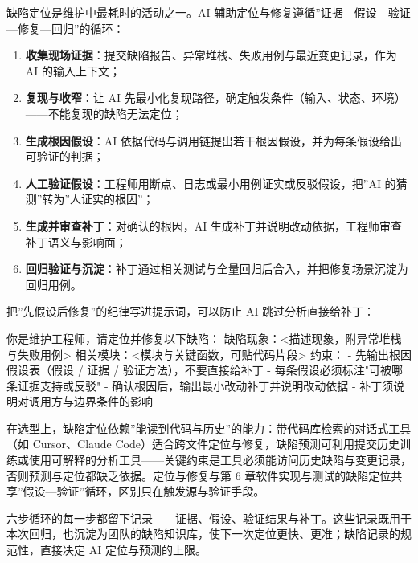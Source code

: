 \documentclass[12pt,a4paper,twoside,openany]{ctexbook}
\numberwithin{figure}{chapter}
\numberwithin{table}{chapter}
\newenvironment{Shaded}{}{}
\newcommand{\NormalTok}[1]{#1}
\providecommand{\tightlist}{\setlength{\itemsep}{0pt}\setlength{\parskip}{0pt}}
\begin{document}
缺陷定位是维护中最耗时的活动之一。AI
辅助定位与修复遵循''证据---假设---验证---修复---回归''的循环：

\begin{enumerate}
\def\labelenumi{\arabic{enumi}.}
\tightlist
\item
  \textbf{收集现场证据}：提交缺陷报告、异常堆栈、失败用例与最近变更记录，作为
  AI 的输入上下文；
\item
  \textbf{复现与收窄}：让 AI
  先最小化复现路径，确定触发条件（输入、状态、环境）------不能复现的缺陷无法定位；
\item
  \textbf{生成根因假设}：AI
  依据代码与调用链提出若干根因假设，并为每条假设给出可验证的判据；
\item
  \textbf{人工验证假设}：工程师用断点、日志或最小用例证实或反驳假设，把''AI
  的猜测''转为''人证实的根因''；
\item
  \textbf{生成并审查补丁}：对确认的根因，AI
  生成补丁并说明改动依据，工程师审查补丁语义与影响面；
\item
  \textbf{回归验证与沉淀}：补丁通过相关测试与全量回归后合入，并把修复场景沉淀为回归用例。
\end{enumerate}

把''先假设后修复''的纪律写进提示词，可以防止 AI 跳过分析直接给补丁：

\begin{Shaded}
\begin{Highlighting}[]
\NormalTok{你是维护工程师，请定位并修复以下缺陷：}
\NormalTok{缺陷现象：\textless{}描述现象，附异常堆栈与失败用例\textgreater{}}
\NormalTok{相关模块：\textless{}模块与关键函数，可贴代码片段\textgreater{}}
\NormalTok{约束：}
\NormalTok{{-} 先输出根因假设表（假设 / 证据 / 验证方法），不要直接给补丁}
\NormalTok{{-} 每条假设必须标注"可被哪条证据支持或反驳"}
\NormalTok{{-} 确认根因后，输出最小改动补丁并说明改动依据}
\NormalTok{{-} 补丁须说明对调用方与边界条件的影响}
\end{Highlighting}
\end{Shaded}

在选型上，缺陷定位依赖''能读到代码与历史''的能力：带代码库检索的对话式工具（如
Cursor、Claude
Code）适合跨文件定位与修复，缺陷预测可利用提交历史训练或使用可解释的分析工具------关键约束是工具必须能访问历史缺陷与变更记录，否则预测与定位都缺乏依据。定位与修复与第
6
章软件实现与测试的缺陷定位共享''假设---验证''循环，区别只在触发源与验证手段。

六步循环的每一步都留下记录------证据、假设、验证结果与补丁。这些记录既用于本次回归，也沉淀为团队的缺陷知识库，使下一次定位更快、更准；缺陷记录的规范性，直接决定
AI 定位与预测的上限。
\end{document}

